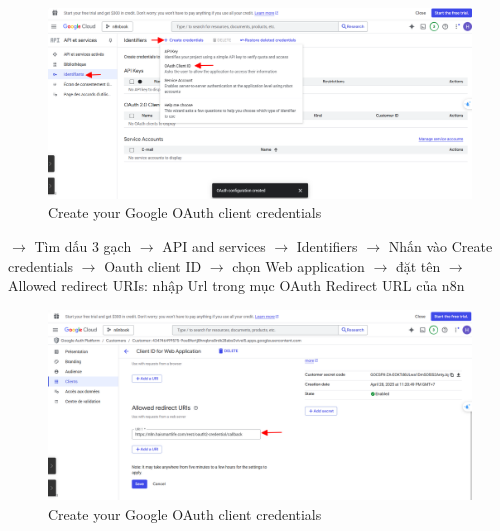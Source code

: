     \begin{figure}[H]
    \centering
    \includegraphics[width=1\textwidth]{images/3thuchi10.png}
    \caption{Create your Google OAuth client credentials}
    \end{figure}
    
$\longrightarrow$ Tìm dấu 3 gạch $\longrightarrow$ API and services $\longrightarrow$ Identifiers $\longrightarrow$ Nhấn vào Create credentials $\longrightarrow$ Oauth client ID $\longrightarrow$ chọn Web application $\longrightarrow$ đặt tên $\longrightarrow$ Allowed redirect URIs: nhập Url trong mục OAuth Redirect URL của n8n

    
    \begin{figure}[H]
    \centering
    \includegraphics[width=1\textwidth]{images/3thuchi11.png}
    \caption{Create your Google OAuth client credentials}
    \end{figure}


    








